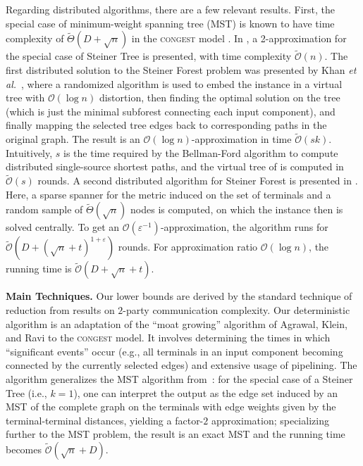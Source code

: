 \documentclass[letterpaper,11pt]{article}
\newcommand{\BO}{\mathcal{O}}
\newcommand{\sO}{\tilde{\mathcal{O}}}
\newcommand{\Congest}{\textsc{congest}\xspace}
\renewcommand{\paragraph}[1]{\smallskip\par\noindent\textbf{#1}}
\begin{document}
Regarding distributed algorithms, there are a few relevant results. First, the
special case of minimum-weight spanning tree (MST) is known to have time
complexity of $\tilde\Theta(D+\sqrt n)$ in the \Congest model
\cite{DHKNPPW-11,Elkin-MST,GarayKP-98,KuttenP-98,PelegR-00}. In \cite{CF05}, a
2-approximation for the special case of Steiner Tree is presented, with time
complexity $\sO(n)$. The first distributed solution to the Steiner Forest
problem was presented by Khan \textit{et al.}~\cite{KKMPT-12}, where a
randomized algorithm is used to embed the instance in a virtual tree with
$\BO(\log n)$ distortion, then finding the optimal solution on the tree (which
is just the minimal subforest connecting each input component), and finally
mapping the selected tree edges back to corresponding paths in the original
graph. The result is an $\BO(\log n)$-approximation in time $\sO(sk)$.
Intuitively, $s$ is the time required by the Bellman-Ford algorithm to compute
distributed single-source shortest paths, and the virtual tree of
\cite{KKMPT-12} is computed in $\sO(s)$ rounds.
A second distributed algorithm for Steiner Forest is presented in
\cite{LenzenP13}.
Here, a sparse spanner for the metric induced on the set of terminals and a
random sample of $\tilde{\Theta}(\sqrt{n})$ nodes is computed, on which the
instance then is solved centrally. To get an
$\BO(\varepsilon^{-1})$-approximation, the algorithm runs for $\sO(D+(\sqrt
n+t)^{1+\varepsilon})$ rounds. For approximation ratio $\BO(\log n)$,
the running time is $\sO(D+\sqrt n+t)$. 

\paragraph{Main Techniques.}
Our lower
bounds are
derived by the standard technique of reduction from results on $2$-party
communication complexity.
Our deterministic algorithm is an adaptation of the ``moat growing'' algorithm
of Agrawal, Klein, and Ravi \cite{AgrawalKR-95} to the \Congest model. It
involves determining the times in which ``significant events'' occur (e.g., all
terminals in an input component becoming connected by the currently selected
edges)
and extensive usage of pipelining. The algorithm generalizes
the MST algorithm from~\cite{KuttenP-98}: for the special case of a Steiner Tree (i.e.,
$k=1$), one can interpret the output as the edge set induced by an MST of the
complete graph on the terminals with edge weights given by the terminal-terminal
distances, yielding a factor-$2$ approximation; specializing further to the MST
problem, the result is an exact MST and the running time becomes
$\sO(\sqrt{n}+D)$.
\end{document}
